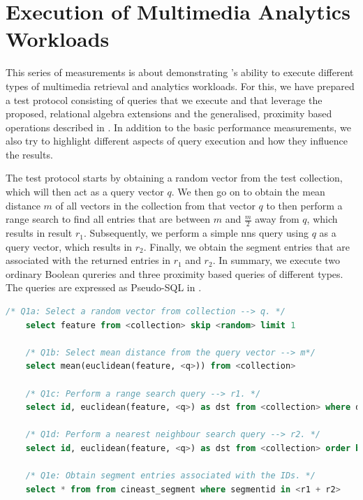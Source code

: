 \section{Execution of Multimedia Analytics Workloads}
\label{section:evaluation_analytics}

This series of measurements is about demonstrating \cottontail{}'s ability to execute different types of multimedia retrieval and analytics workloads. For this, we have prepared a test protocol consisting of queries that we execute and that leverage the proposed, relational algebra extensions and the generalised, proximity based operations described in . In addition to the basic performance measurements, we also try to highlight different aspects of query execution and how they influence the results.

The test protocol starts by obtaining a random vector from the test collection, which will then act as a query vector $q$. We then go on to obtain the mean distance $m$ of all vectors in the collection from that vector $q$ to then perform a range search to find all entries that are between $m$ and $\frac{m}{2}$ away from $q$, which results in result $r_1{}$. Subsequently, we perform a simple \acrshort{nns} query using $q$ as a query vector, which results in $r_2$. Finally, we obtain the segment entries that are associated with the returned entries in $r_1$ and $r_2$. In summary, we execute two ordinary Boolean qureries and three proximity based queries of different types. The queries are expressed as Pseudo-SQL in .

\begin{lstlisting}[language=SQL, caption={Pseudo-SQL of the queries executed for the analytics workload evaluation.}, label=listing:analytics_queries, numbers=none]
    /* Q1a: Select a random vector from collection --> q. */
    select feature from <collection> skip <random> limit 1
    
    /* Q1b: Select mean distance from the query vector --> m*/
    select mean(euclidean(feature, <q>)) from <collection> 

    /* Q1c: Perform a range search query --> r1. */
    select id, euclidean(feature, <q>) as dst from <collection> where dst BETWEEN (m/2.0, m) order by dst asc limit 1000

    /* Q1d: Perform a nearest neighbour search query --> r2. */
    select id, euclidean(feature, <q>) as dst from <collection> order by dst asc limit 1000

    /* Q1e: Obtain segment entries associated with the IDs. */
    select * from from cineast_segment where segmentid in <r1 + r2>
\end{lstlisting}

